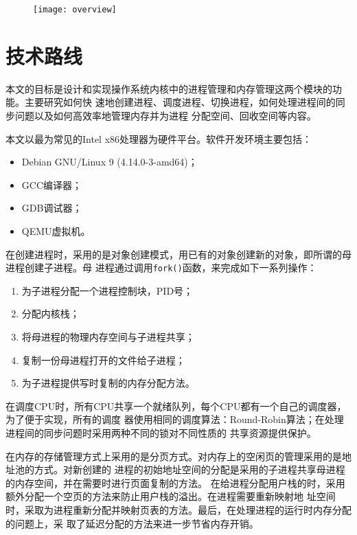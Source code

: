 \documentclass{swfcthesismscctex}
\begin{document}
\begin{figure}
  \centering
  \texttt{[image: overview]}
  \label{fig:overview}
\end{figure}

\section{技术路线}

本文的目标是设计和实现操作系统内核中的进程管理和内存管理这两个模块的功能。主要研究如何快
速地创建进程、调度进程、切换进程，如何处理进程间的同步问题以及如何高效率地管理内存并为进程
分配空间、回收空间等内容。

本文以最为常见的Intel x86处理器为硬件平台。软件开发环境主要包括：
\begin{itemize}
\item Debian GNU/Linux 9 (4.14.0-3-amd64)；
\item GCC编译器；
\item GDB调试器；
\item QEMU虚拟机。
\end{itemize}

在创建进程时，采用的是对象创建模式，用已有的对象创建新的对象，即所谓的母进程创建子进程。母
进程通过调用\texttt{fork()}函数，来完成如下一系列操作：
\begin{enumerate}
\item 为子进程分配一个进程控制块，PID号；
\item 分配内核栈；
\item 将母进程的物理内存空间与子进程共享；
\item 复制一份母进程打开的文件给子进程；
\item 为子进程提供写时复制的内存分配方法。
\end{enumerate}

在调度CPU时，所有CPU共享一个就绪队列，每个CPU都有一个自己的调度器，为了便于实现，所有的调度
器使用相同的调度算法：Round-Robin算法；在处理进程间的同步问题时采用两种不同的锁对不同性质的
共享资源提供保护。

在内存的存储管理方式上采用的是分页方式。对内存上的空闲页的管理采用的是地址池的方式。对新创建的
进程的初始地址空间的分配是采用的子进程共享母进程的内存空间，并在需要时进行页面复制的方法。
在给进程分配用户栈的时，采用额外分配一个空页的方法来防止用户栈的溢出。在进程需要重新映射地
址空间时，采取为进程重新分配并映射页表的方法。最后，在处理进程的运行时内存分配的问题上，采
取了延迟分配的方法来进一步节省内存开销。
\end{document}
